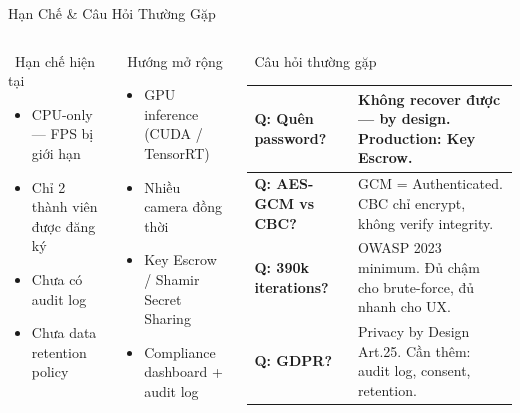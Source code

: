\documentclass[aspectratio=169, 11pt]{beamer}
\begin{document}
\begin{frame}{Hạn Chế \& Câu Hỏi Thường Gặp}
\begin{columns}[T]
\begin{alertblock}{\faTimes\ Hạn chế hiện tại}
\begin{itemize}\footnotesize
  \item CPU-only --- FPS bị giới hạn
  \item Chỉ 2 thành viên được đăng ký
  \item Chưa có audit log
  \item Chưa data retention policy
\end{itemize}
\end{alertblock}
\begin{block}{\faArrowRight\ Hướng mở rộng}
\begin{itemize}\footnotesize
  \item GPU inference (CUDA / TensorRT)
  \item Nhiều camera đồng thời
  \item Key Escrow / Shamir Secret Sharing
  \item Compliance dashboard + audit log
\end{itemize}
\end{block}
\begin{block}{\faQuestionCircle\ Câu hỏi thường gặp}
\footnotesize\renewcommand{\arraystretch}{1.5}
\begin{tabularx}{\linewidth}{lX}
\textbf{Q: Quên password?} & Không recover được --- by design. Production: Key Escrow. \\
\hline
\textbf{Q: AES-GCM vs CBC?} & GCM = Authenticated. CBC chỉ encrypt, không verify integrity. \\
\hline
\textbf{Q: 390k iterations?} & OWASP 2023 minimum. Đủ chậm cho brute-force, đủ nhanh cho UX. \\
\hline
\textbf{Q: GDPR?} & Privacy by Design Art.25. Cần thêm: audit log, consent, retention. \\
\end{tabularx}
\end{block}
\end{columns}
\end{frame}
\end{document}
